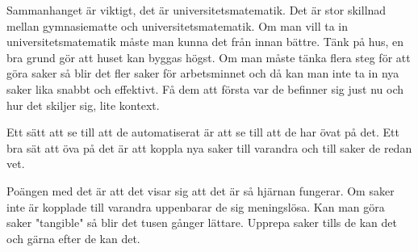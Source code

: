 \par\bigskip
\noindent Sammanhanget är viktigt, det är universitetsmatematik. Det är stor skillnad mellan gymnasiematte och universitetsmatematik. Om man vill ta in universitetsmatematik måste man kunna det från innan bättre. Tänk på hus, en bra grund gör att huset kan byggas högst. Om man måste tänka flera steg för att göra saker så blir det fler saker för arbetsminnet och då kan man inte ta in nya saker lika snabbt och effektivt. Få dem att första var de befinner sig just nu och hur det skiljer sig, lite kontext. 
\par\bigskip
\noindent Ett sätt att se till att de automatiserat är att se till att de har övat på det. Ett bra sät att öva på det är att koppla nya saker till varandra och till saker de redan vet.\par
\noindent Poängen med det är att det visar sig att det är så hjärnan fungerar. Om saker inte är kopplade till varandra uppenbarar de sig meningslösa. Kan man göra saker "tangible" så blir det tusen gånger lättare. Upprepa saker tills de kan det och gärna efter de kan det. 
\par\bigskip
